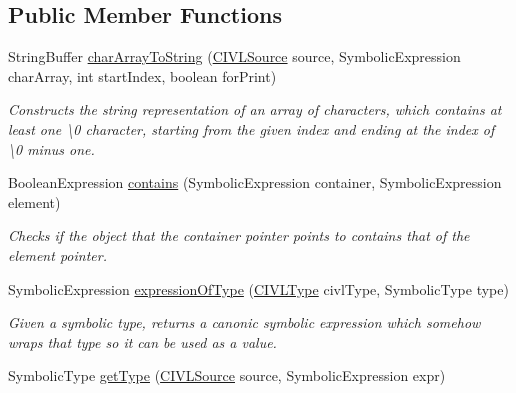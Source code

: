 \subsection*{Public Member Functions}
\begin{DoxyCompactItemize}
\item 
String\+Buffer \hyperlink{interfaceedu_1_1udel_1_1cis_1_1vsl_1_1civl_1_1dynamic_1_1IF_1_1SymbolicUtility_a1679028fb7cb5ab96a8905185249b61c}{char\+Array\+To\+String} (\hyperlink{interfaceedu_1_1udel_1_1cis_1_1vsl_1_1civl_1_1model_1_1IF_1_1CIVLSource}{C\+I\+V\+L\+Source} source, Symbolic\+Expression char\+Array, int start\+Index, boolean for\+Print)
\begin{DoxyCompactList}\small\item\em Constructs the string representation of an array of characters, which contains at least one \textquotesingle{}\textbackslash{}0\textquotesingle{} character, starting from the given index and ending at the index of \textquotesingle{}\textbackslash{}0\textquotesingle{} minus one. \end{DoxyCompactList}\item 
Boolean\+Expression \hyperlink{interfaceedu_1_1udel_1_1cis_1_1vsl_1_1civl_1_1dynamic_1_1IF_1_1SymbolicUtility_a4008ab17a75fe949bcb5674096463cb9}{contains} (Symbolic\+Expression container, Symbolic\+Expression element)
\begin{DoxyCompactList}\small\item\em Checks if the object that the container pointer points to contains that of the element pointer. \end{DoxyCompactList}\item 
Symbolic\+Expression \hyperlink{interfaceedu_1_1udel_1_1cis_1_1vsl_1_1civl_1_1dynamic_1_1IF_1_1SymbolicUtility_a9d79c66017bf3533f5545ecdce61f1b8}{expression\+Of\+Type} (\hyperlink{interfaceedu_1_1udel_1_1cis_1_1vsl_1_1civl_1_1model_1_1IF_1_1type_1_1CIVLType}{C\+I\+V\+L\+Type} civl\+Type, Symbolic\+Type type)
\begin{DoxyCompactList}\small\item\em Given a symbolic type, returns a canonic symbolic expression which somehow wraps that type so it can be used as a value. \end{DoxyCompactList}\item 
Symbolic\+Type \hyperlink{interfaceedu_1_1udel_1_1cis_1_1vsl_1_1civl_1_1dynamic_1_1IF_1_1SymbolicUtility_a91419d6daccfe07631b1da5885799b6b}{get\+Type} (\hyperlink{interfaceedu_1_1udel_1_1cis_1_1vsl_1_1civl_1_1model_1_1IF_1_1CIVLSource}{C\+I\+V\+L\+Source} source, Symbolic\+Expression expr)

\end{DoxyCompactItemize}
